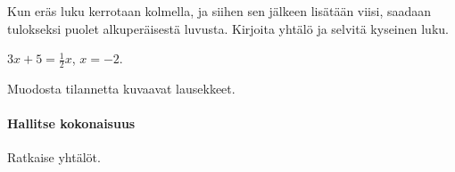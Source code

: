 \begin{tehtavasivu}
\begin{tehtava}
    Kun eräs luku kerrotaan kolmella, ja siihen sen jälkeen lisätään viisi, saadaan tulokseksi puolet alkuperäisestä luvusta.
    Kirjoita yhtälö ja selvitä kyseinen luku.
    \begin{vastaus}
        $3x+5=\frac12x$, $x=-2$.
    \end{vastaus}
\end{tehtava}

\begin{tehtava}
    Muodosta tilannetta kuvaavat lausekkeet.
    \begin{alakohdat}
    \end{alakohdat}
    \begin{vastaus}
        \begin{alakohdat}
        \end{alakohdat}
    \end{vastaus}
\end{tehtava}



\paragraph*{Hallitse kokonaisuus}

\begin{tehtava}
    Ratkaise yhtälöt.
    \begin{alakohdat}
    \end{alakohdat}
    \begin{vastaus}
        \begin{alakohdat}
        \end{alakohdat}
    \end{vastaus}
\end{tehtava}


\end{tehtavasivu}
